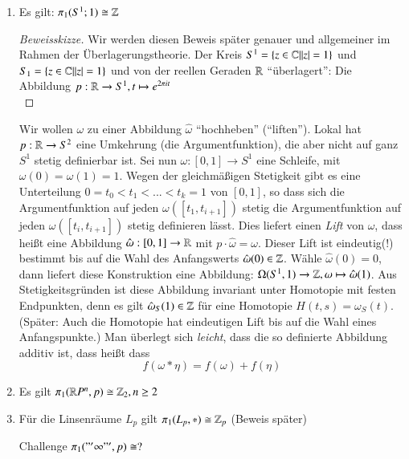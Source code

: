 \documentclass[a4paper,10pt]{scrartcl}
\newcommand{\homo}{\cong}
\begin{document}
\begin{exs*}
\begin{enumerate}[(1)]
\begin{seg}{Exkurs: flächenfüllende "`Kurve"' (=Weg)}
Sei $x\in [0,1]$ und sei zum  Beispiel $x=0,00101...$ in Binärdarstellung unterteile das Dreieck in sukzessive in kleinere Dreiecke:\\
\fixme[fig60]\\
Die so entstehende Folge konvergiert gegen einen Limes $f(x)$ und die Abbildung $[0,1]\to A$ ist \emph{surjektiv} und \emph{stetig}.
\end{seg}
\item Es gilt: $\pi_1(S^1; 1)\homo \Z$
\begin{proof}[Beweisskizze]
Wir werden diesen Beweis später genauer und allgemeiner im Rahmen der Überlagerungstheorie. Der Kreis $S^1=\{ z\in \mathbb{C}| |z|=1\}$ und $S_1=\{z\in \mathbb{C}||z|=1\}$ und von der reellen Geraden $\mathbb{R}$ "`überlagert"': Die Abbildung $p:  \mathbb{R}\to S^1, t\mapsto e^{2\pi i t}$\\
\fixme[fig61]
\end{proof}
Wir wollen $\omega$ zu einer Abbildung $\hat\omega$ "`hochheben"' ("`liften"'). Lokal hat $p: \mathbb{R}  \to S^2$ eine Umkehrung (die Argumentfunktion), die aber nicht auf ganz $S^1$ stetig definierbar ist. Sei nun $\omega: [0,1]\to S^1$ eine Schleife, mit $\omega(0)=\omega(1)=1$. Wegen der gleichmäßigen Stetigkeit gibt es eine Unterteilung $0=t_0<t_1<...<t_k=1$ von $[0,1]$, so dass sich die Argumentfunktion auf jeden $\omega([t_1,t_{i+1}])$ stetig die Argumentfunktion auf jeden $\omega([t_i, t_{i+1}])$ stetig definieren lässt. Dies liefert einen \emph{Lift} von $\omega$, dass heißt eine Abbildung $\hat \omega: [0,1]\to \mathbb{R}$ mit $p \cdot \hat \omega=\omega$. Dieser Lift ist eindeutig(!) bestimmt bis auf die Wahl des Anfangswerts $\hat \omega(0) \in \mathbb{Z}$. Wähle $\hat \omega(0)=0$, dann liefert diese Konstruktion eine Abbildung: $\Omega(S^1, 1)\to \mathbb{Z}, \omega \mapsto \hat \omega(1)$. Aus Stetigkeitsgründen ist diese Abbildung invariant unter Homotopie mit festen Endpunkten, denn es gilt $\hat \omega_S(1)\in \mathbb{Z}$ für eine Homotopie $H(t,s)=\omega_S(t)$. (Später: Auch die Homotopie hat eindeutigen Lift bis auf die Wahl eines Anfangspunkte.) Man überlegt sich \emph{leicht}, dass die so definierte Abbildung additiv ist, dass heißt dass
\[
 f(\omega*\eta)=f(\omega)+f(\eta)
\]
\item Es gilt $\pi_1(\R P^n, p)\homo \Z_2, n\ge 2$
\item Für die Linsenräume $L_p$ gilt $\pi_1(L_p,*)\homo \Z_p$ (Beweis später)
\begin{seg}{Challenge}
\fixme[fig62]
$\pi_1("'\infty"', p) \homo ?$
\end{seg}
 \end{enumerate}
\end{exs*}
\end{document}
